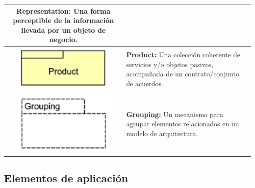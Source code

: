 \begin{longtable}{|c|p{8cm}|}
\textbf{Representation:} Una forma perceptible de la información llevada por un objeto de negocio. \\
\hline
\includegraphics{apendices/ARCHI/business/product.png} & 
\textbf{Product:} Una colección coherente de servicios y/o objetos pasivos, acompañada de un contrato/conjunto de acuerdos. \\
\hline
\includegraphics{apendices/ARCHI/business/grouping.png} &
\textbf{Grouping:} Un mecanismo para agrupar elementos relacionados en un modelo de arquitectura. \\
\end{longtable}

\subsection{Elementos de aplicación}

